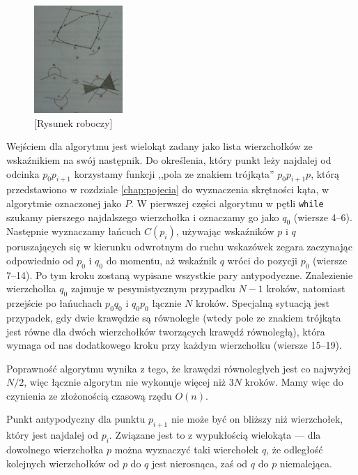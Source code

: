 \begin{figure}[htp]
  \centering
  \includegraphics[width=0.3\textwidth]{img/diameter}
  \caption{[Rysunek roboczy]\label{fig:diameter}}
\end{figure}

Wejściem dla algorytmu jest wielokąt zadany jako lista wierzchołków ze
wskaźnikiem na swój następnik. Do określenia, który punkt leży
najdalej od odcinka $p_{0}p_{i+1}$ korzystamy funkcji ,,pola ze
znakiem trójkąta'' $p_{0}p_{i+1}p$, którą przedstawiono w
rozdziale \ref{chap:pojecia} do wyznaczenia skrętności kąta, w
algorytmie oznaczonej jako $P$. W pierwszej części algorytmu w pętli
\texttt{while} szukamy pierszego najdalszego wierzchołka i oznaczamy
go jako $q_0$ (wiersze 4--6). Następnie wyznaczamy łańcuch $C(p_i)$,
używając wskaźników $p$ i $q$ poruszających się w kierunku odwrotnym
do ruchu wskazówek zegara zaczynając odpowiednio od $p_0$ i $q_0$ do
momentu, aż wskaźnik $q$ wróci do pozycji $p_0$ (wiersze 7--14). Po
tym kroku zostaną wypisane wszystkie pary antypodyczne. Znalezienie
wierzchołka $q_0$ zajmuje w pesymistycznym przypadku $N-1$ kroków,
natomiast przejście po łańuchach $p_{0}q_{0}$ i $q_{0}p_{0}$ łącznie
$N$ kroków. Specjalną sytuacją jest przypadek, gdy dwie krawędzie są
równoległe (wtedy pole ze znakiem trójkąta jest równe dla dwóch
wierzchołków tworzących krawędź równoległą), która wymaga od nas
dodatkowego kroku przy każdym wierzchołku (wiersze 15--19).

Poprawność algorytmu wynika z tego, że krawędzi równoległych jest co
najwyżej $N/2$, więc łącznie algorytm nie wykonuje więcej niż $3N$
kroków. Mamy więc do czynienia ze złożonością czasową rzędu $O(n)$.

Punkt antypodyczny dla punktu $p_{i+1}$ nie może być on bliższy niż
wierzchołek, który jest najdalej od $p_i$. Związane jest to z
wypukłością wielokąta --- dla dowolnego wierzchołka $p$ można
wyznaczyć taki wierchołek $q$, że odległość kolejnych wierzchołków od
$p$ do $q$ jest nierosnąca, zaś od $q$ do $p$ niemalejąca.

